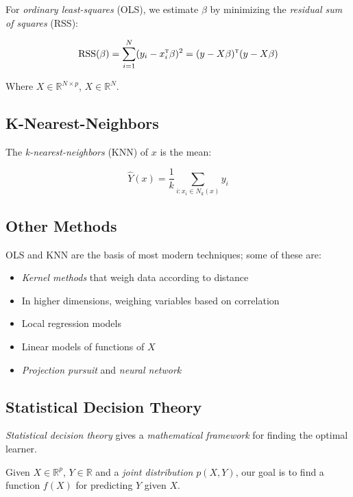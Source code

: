 \documentclass[twoside,twocolumn,10pt]{revtex4-1}
\begin{document}
	For \textit{ordinary least-squares} (OLS), we estimate $\beta$ by minimizing the \textit{residual sum of squares} (RSS):
	
	\begin{equation*}
	\text{RSS} (\beta) = \sum_{i=1}^N (y_i - x_i^\textsc{t} \beta)^2 = (y - X \beta)^\textsc{t} (y - X \beta)
	\end{equation*}
	
	Where $X \in \mathbb{R}^{N \times p}$, $X \in \mathbb{R}^N$.
	
	\subsection{K-Nearest-Neighbors}
	
	The \textit{k-nearest-neighbors} (KNN) of $x$ is the mean:
	
	\begin{equation*}
	\hat{Y}(x) = \frac{1}{k} \sum_{i:x_i \in N_k(x)} y_i
	\end{equation*}
	
	\subsection{Other Methods}
	
	OLS and KNN are the basis of most modern techniques; some of these are:
	
	\begin{itemize}
	\item \textit{Kernel methods} that weigh data according to distance
	\item In higher dimensions, weighing variables based on correlation
	\item Local regression models
	\item Linear models of functions of $X$
	\item \textit{Projection pursuit} and \textit{neural network}
	\end{itemize}
	
	\subsection{Statistical Decision Theory}
	
	\textit{Statistical decision theory} gives a \textit{mathematical framework} for finding the optimal learner.
	
	Given $X \in \mathbb{R}^p$, $Y \in \mathbb{R}$ and a \textit{joint distribution} $p(X,Y)$, our goal is to find a function $f(X)$ for predicting $Y$ given $X$.
	
\end{document}
